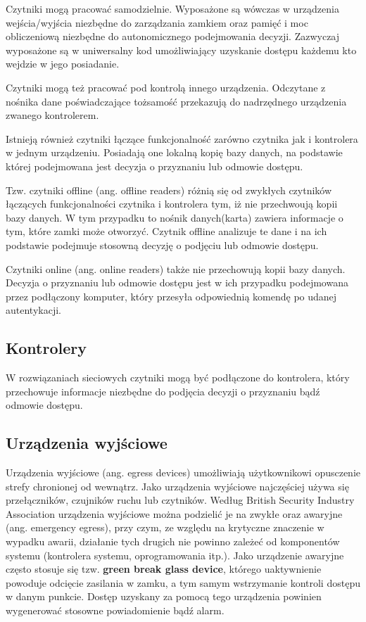 Czytniki mogą pracować samodzielnie. Wyposażone są wówczas w urządzenia wejścia/wyjścia niezbędne do zarządzania zamkiem oraz pamięć i moc obliczeniową niezbędne do autonomicznego podejmowania decyzji. Zazwyczaj wyposażone są w uniwersalny kod umożliwiający uzyskanie dostępu każdemu kto wejdzie w jego posiadanie.~\cite{bsia2016}

Czytniki mogą też pracować pod kontrolą innego urządzenia. Odczytane z nośnika dane poświadczające tożsamość przekazują do nadrzędnego urządzenia zwanego kontrolerem.~\cite{bsia2016}

Istnieją również czytniki łączące funkcjonalność zarówno czytnika jak i kontrolera w jednym urządzeniu. Posiadają one lokalną kopię bazy danych, na podstawie której podejmowana jest decyzja o przyznaniu lub odmowie dostępu.~\cite{bsia2016}

Tzw. czytniki offline (ang. offline readers) różnią się od zwykłych czytników łączących funkcjonalności czytnika i kontrolera tym, iż nie przechwoują kopii bazy danych. W tym przypadku to nośnik danych(karta) zawiera informacje o tym, które zamki może otworzyć. Czytnik offline analizuje te dane i na ich podstawie podejmuje stosowną decyzję o podjęciu lub odmowie dostępu.~\cite{bsia2016}

Czytniki online (ang. online readers) także nie przechowują kopii bazy danych. Decyzja o przyznaniu lub odmowie dostępu jest w ich przypadku podejmowana przez podłączony komputer, który przesyła odpowiednią komendę po udanej autentykacji.~\cite{bsia2016}

\subsection{Kontrolery}
W rozwiązaniach sieciowych czytniki mogą być podłączone do kontrolera, który przechowuje informacje niezbędne do podjęcia decyzji o przyznaniu bądź odmowie dostępu.~\cite{bsia2016}

\subsection{Urządzenia wyjściowe}
Urządzenia wyjściowe (ang. egress devices) umożliwiają użytkownikowi opusczenie strefy chronionej od wewnątrz. Jako urządzenia wyjściowe najczęściej używa się przełączników, czujników ruchu lub czytników. Według British Security Industry Association urządzenia wyjściowe można podzielić je na zwykłe oraz awaryjne (ang. emergency egress), przy czym, ze względu na krytyczne znaczenie w wypadku awarii, działanie tych drugich nie powinno zależeć od komponentów systemu (kontrolera systemu, oprogramowania itp.). Jako urządzenie awaryjne często stosuje się tzw. \textbf{green break glass device}, którego uaktywnienie powoduje odcięcie zasilania w zamku, a tym samym wstrzymanie kontroli dostępu w danym punkcie. Dostęp uzyskany za pomocą tego urządzenia powinien wygenerować stosowne powiadomienie bądź alarm.~\cite{bsia2016}

